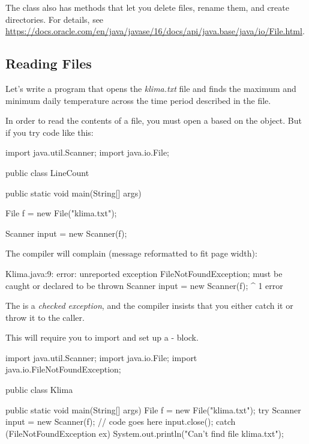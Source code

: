 The  class also has methods that let you delete files, rename them, and create directories. For details, see \url{https://docs.oracle.com/en/java/javase/16/docs/api/java.base/java/io/File.html}.

\subsection{Reading Files}

Let's write a program that opens the {\em klima.txt} file and finds the maximum and minimum daily temperature across the time period described in the file.

In order to read the contents of a file, you must open a  based on the  object. But if you try code like this:

\begin{code}
import java.util.Scanner;
import java.io.File;

public class LineCount {

    public static void main(String[] args) {        
        File f = new File("klima.txt");
        
        Scanner input = new Scanner(f);
    }
}
\end{code}

The compiler will complain (message reformatted to fit page width):

\begin{stdout}
Klima.java:9: error: unreported exception
FileNotFoundException; must be caught or declared to be thrown
        Scanner input = new Scanner(f);
                        ^
1 error
\end{stdout}

The  is a {\em checked exception}, and the compiler insists that you either catch it or throw it to the caller.

This will require you to import  and set up a - block. 

\begin{code}
import java.util.Scanner;
import java.io.File;
import java.io.FileNotFoundException;

public class Klima {

    public static void main(String[] args) {        
        File f = new File("klima.txt");
        try {
            Scanner input = new Scanner(f);
            // code goes here
            input.close();
        }
        catch (FileNotFoundException ex) {
            System.out.println("Can't find file klima.txt");
        }
    }
}
\end{code}

